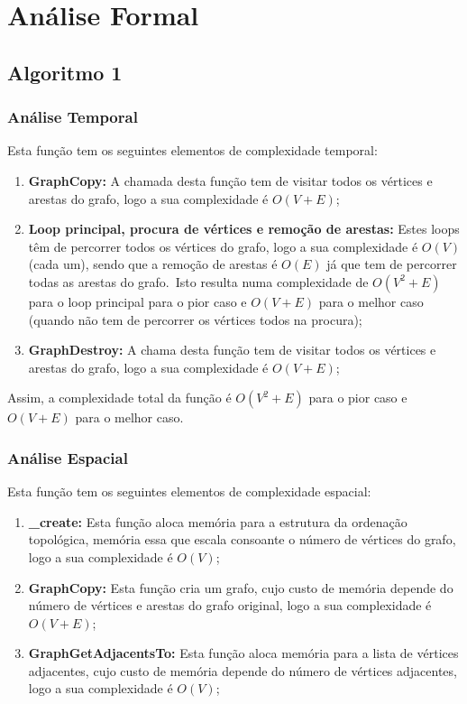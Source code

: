 \chapter{Análise Formal}
\label{ch:analise-formal}

\section{Algoritmo 1}
\label{sec:analise-formal:algoritmo-1}

\subsection{Análise Temporal}
\label{sec:analise-formal:algoritmo-1:analise-temporal}

Esta função tem os seguintes elementos de complexidade temporal:

\begin{enumerate}
    \item \textbf{GraphCopy:} A chamada desta função tem de visitar todos os vértices e arestas do grafo, logo a sua complexidade é $O(V + E)$;
    \item \textbf{Loop principal, procura de vértices e remoção de arestas:} Estes loops têm de percorrer todos os vértices do grafo, logo a sua complexidade é $O(V)$ (cada um), sendo que a remoção de arestas é $O(E)$ já que tem de percorrer todas as arestas do grafo.\ Isto resulta numa complexidade de $O(V^2 + E)$ para o loop principal para o pior caso e $O(V + E)$ para o melhor caso (quando não tem de percorrer os vértices todos na procura);
    \item \textbf{GraphDestroy:} A chama desta função tem de visitar todos os vértices e arestas do grafo, logo a sua complexidade é $O(V + E)$;
\end{enumerate}

Assim, a complexidade total da função é $O(V^2 + E)$ para o pior caso e $O(V + E)$ para o melhor caso.

\subsection{Análise Espacial}
\label{sec:analise-formal:algoritmo-1:analise-espacial}

Esta função tem os seguintes elementos de complexidade espacial:

\begin{enumerate}
    \item \textbf{\_create:} Esta função aloca memória para a estrutura da ordenação topológica, memória essa que escala consoante o número de vértices do grafo, logo a sua complexidade é $O(V)$;
    \item \textbf{GraphCopy:} Esta função cria um grafo, cujo custo de memória depende do número de vértices e arestas do grafo original, logo a sua complexidade é $O(V + E)$;
    \item \textbf{GraphGetAdjacentsTo:} Esta função aloca memória para a lista de vértices adjacentes, cujo custo de memória depende do número de vértices adjacentes, logo a sua complexidade é $O(V)$;
\end{enumerate}

